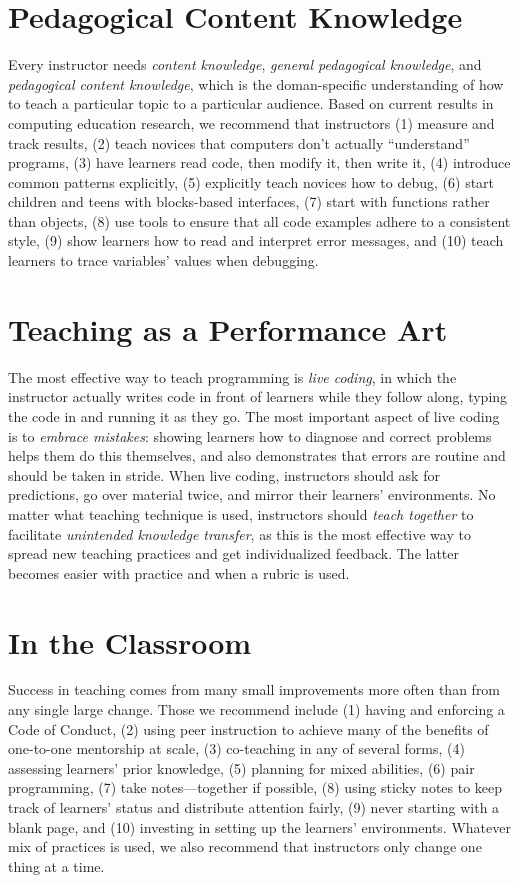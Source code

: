 \documentclass{article}
\begin{document}
\section{Pedagogical Content Knowledge}

Every instructor needs \emph{content knowledge},
\emph{general pedagogical knowledge},
and \emph{pedagogical content knowledge},
which is the doman-specific understanding of how to teach a particular topic to a particular audience.
Based on current results in computing education research,
we recommend that instructors (1) measure and track results,
(2) teach novices that computers don't actually ``understand'' programs,
(3) have learners read code, then modify it, then write it,
(4) introduce common patterns explicitly,
(5) explicitly teach novices how to debug,
(6) start children and teens with blocks-based interfaces,
(7) start with functions rather than objects,
(8) use tools to ensure that all code examples adhere to a consistent style,
(9) show learners how to read and interpret error messages, and
(10) teach learners to trace variables' values when debugging.

\section{Teaching as a Performance Art}

The most effective way to teach programming is \emph{live coding},
in which the instructor actually writes code in front of learners
while they follow along,
typing the code in and running it as they go.
The most important aspect of live coding is to \emph{embrace mistakes}:
showing learners how to diagnose and correct problems helps them do this themselves,
and also demonstrates that errors are routine and should be taken in stride.
When live coding,
instructors should ask for predictions,
go over material twice,
and mirror their learners' environments.
No matter what teaching technique is used,
instructors should \emph{teach together}
to facilitate \emph{unintended knowledge transfer},
as this is the most effective way to spread new teaching practices
and get individualized feedback.
The latter becomes easier with practice and when a rubric is used.

\section{In the Classroom}

Success in teaching comes from many small improvements more often than from any single large change.
Those we recommend include
(1) having and enforcing a Code of Conduct,
(2) using peer instruction to achieve many of the benefits of one-to-one mentorship at scale,
(3) co-teaching in any of several forms,
(4) assessing learners' prior knowledge,
(5) planning for mixed abilities,
(6) pair programming,
(7) take notes---together if possible,
(8) using sticky notes to keep track of learners' status and distribute attention fairly,
(9) never starting with a blank page, and 
(10) investing in setting up the learners' environments.
Whatever mix of practices is used,
we also recommend that instructors only change one thing at a time.
\end{document}
